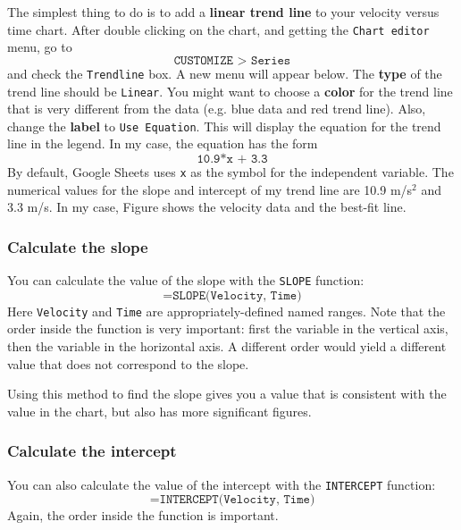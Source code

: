 The simplest thing to do is to add a \textbf{linear trend line} to your velocity versus time chart. After double clicking on the chart, and getting the \texttt{Chart editor} menu, go to
\begin{equation}
    \texttt{CUSTOMIZE > Series}
\end{equation}
and check the \texttt{Trendline} box. A new menu will appear below. The \textbf{type} of the trend line should be \texttt{Linear}. You might want to choose a \textbf{color} for the trend line that is very different from the data (e.g. blue data and red trend line). Also, change the \textbf{label} to \texttt{Use Equation}. This will display the equation for the trend line in the legend. In my case, the equation has the form
\begin{equation}
    \texttt{10.9*x + 3.3}
\end{equation}
By default, Google Sheets uses \texttt{x} as the symbol for the independent variable. The numerical values for the slope and intercept of my trend line are 10.9 m/s$^{2}$ and 3.3 m/s. In my case, Figure shows the velocity data and the best-fit line.
\subsubsection{Calculate the slope}
You can calculate the value of the slope with the \texttt{SLOPE} function:
\begin{equation}
    \texttt{=SLOPE(Velocity, Time)}
\end{equation}
Here \texttt{Velocity} and \texttt{Time} are appropriately-defined named ranges. Note that the order inside the function is very important: first the variable in the vertical axis, then the variable in the horizontal axis. A different order would yield a different value that does not correspond to the slope.

Using this method to find the slope gives you a value that is consistent with the value in the chart, but also has more significant figures.
\subsubsection{Calculate the intercept}
You can also calculate the value of the intercept with the \texttt{INTERCEPT} function:
\begin{equation}
    \texttt{=INTERCEPT(Velocity, Time)}
\end{equation}
Again, the order inside the function is important.

